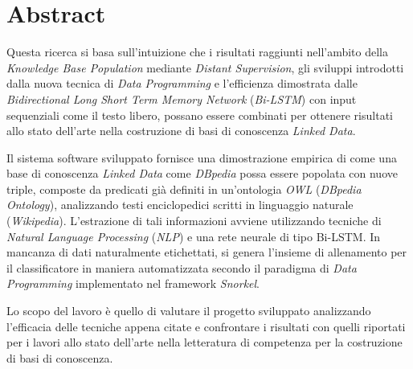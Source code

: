 %
\chapter*{Abstract}
\label{Abstract}
\vspace*{-10mm}

Questa ricerca si basa sull'intuizione che i risultati raggiunti nell'ambito della \textit{Knowledge Base Population} mediante \textit{Distant Supervision}, gli sviluppi introdotti dalla nuova tecnica di \textit{Data Programming} e l'efficienza dimostrata dalle \textit{Bidirectional Long Short Term Memory Network} (\textit{Bi-LSTM}) con input sequenziali come il testo libero, possano essere combinati per ottenere risultati allo stato dell'arte nella costruzione di basi di conoscenza \textit{Linked Data}. 

Il sistema software sviluppato fornisce una dimostrazione empirica di come una base di conoscenza \textit{Linked Data} come \textit{DBpedia} possa essere popolata con nuove triple, composte da predicati già definiti in un'ontologia \textit{OWL} (\textit{DBpedia Ontology}), analizzando testi enciclopedici scritti in linguaggio naturale (\textit{Wikipedia}). L'estrazione di tali informazioni avviene utilizzando tecniche di \textit{Natural Language Processing} (\textit{NLP}) e una rete neurale di tipo Bi-LSTM. In mancanza di dati naturalmente etichettati, si genera l'insieme di allenamento per il classificatore in maniera automatizzata secondo il paradigma di \textit{Data Programming} implementato nel framework \textit{Snorkel}.

Lo scopo del lavoro è quello di valutare il progetto sviluppato analizzando l'efficacia delle tecniche appena citate e confrontare i risultati con quelli riportati per i lavori allo stato dell'arte nella letteratura di competenza per la costruzione di basi di conoscenza.

 








